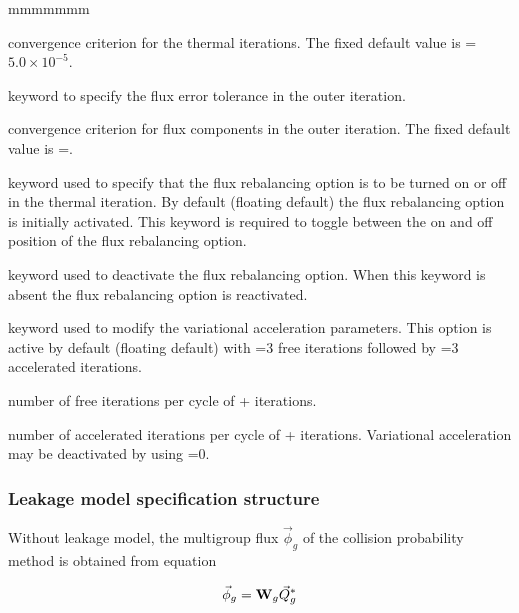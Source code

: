 \begin{ListeDeDescription}{mmmmmmm}
\item[\dusa{epsthr}] convergence criterion for the thermal iterations. The
fixed default value is =$5.0\times 10^{-5}$.

\item[\moc{UNKT}] keyword to specify the flux error tolerance in
the outer iteration.

\item[\dusa{epsunk}] convergence criterion for flux components in the outer
iteration. The fixed default value is =.

\item[\moc{REBA}] keyword used to specify that the flux rebalancing option is
to be turned on or off in the thermal iteration. By default (floating default)
the flux rebalancing option is initially activated. This keyword is required to
toggle between the on and off position of the flux rebalancing option. 

\item[\moc{OFF}] keyword used to deactivate the flux rebalancing option. When
this keyword is absent the flux rebalancing option is reactivated.

\item[\moc{ACCE}] keyword used to modify the variational acceleration
parameters. This option is active by default (floating default) with
=3 free iterations followed by =3 accelerated
iterations. 

\item[\dusa{nlibre}] number of free iterations per cycle of
+ iterations. 

\item[\dusa{naccel}] number of accelerated iterations per cycle of
+ iterations. Variational acceleration may be
deactivated by using =0.

\end{ListeDeDescription}
\clearpage

\subsubsection{Leakage model specification structure}\label{sect:descleak}

Without leakage model, the multigroup flux $\vec\phi_g$ of the collision
probability method is obtained from equation

\begin{equation}
\vec\phi_g={\bf W}_g \vec Q^{*}_g
\label{eq:eq3.64}
\end{equation}

